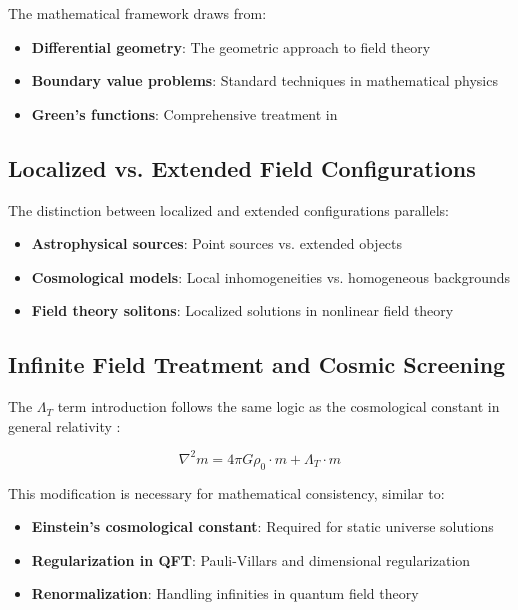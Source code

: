 \documentclass[12pt,a4paper]{article}
\begin{document}
	The mathematical framework draws from:
	\begin{itemize}
		\item \textbf{Differential geometry}: The geometric approach to field theory \citep{misner1973,abraham1988}
		\item \textbf{Boundary value problems}: Standard techniques in mathematical physics \citep{stakgold1998,haberman2004}
		\item \textbf{Green's functions}: Comprehensive treatment in \citep{duffy2001,roach1982}
	\end{itemize}
	
	\subsection{Localized vs. Extended Field Configurations}
	\label{subsec:localized_extended}
	
	The distinction between localized and extended configurations parallels:
	\begin{itemize}
		\item \textbf{Astrophysical sources}: Point sources vs. extended objects \citep{binney2008,carroll2006}
		\item \textbf{Cosmological models}: Local inhomogeneities vs. homogeneous backgrounds \citep{weinberg2008,peebles1993}
		\item \textbf{Field theory solitons}: Localized solutions in nonlinear field theory \citep{rajaraman1982}
	\end{itemize}
	
	\subsection{Infinite Field Treatment and Cosmic Screening}
	\label{subsec:infinite_field_treatment}
	
	The $\Lambda_T$ term introduction follows the same logic as the cosmological constant in general relativity \citep{einstein1917,weinberg1989}:
	
	\begin{equation}
		\nabla^2 m = 4\pi G \rho_0 \cdot m + \Lambda_T \cdot m
	\end{equation}
	
	This modification is necessary for mathematical consistency, similar to:
	\begin{itemize}
		\item \textbf{Einstein's cosmological constant}: Required for static universe solutions \citep{einstein1917}
		\item \textbf{Regularization in QFT}: Pauli-Villars and dimensional regularization \citep{peskin1995}
		\item \textbf{Renormalization}: Handling infinities in quantum field theory \citep{collins1984}
	\end{itemize}
	
\end{document}
